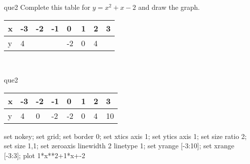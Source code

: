 \documentclass[13.5pt, varwidth=true]{beamer}
\begin{document}
\begin{frame}[shrink=19,fragile]
	\begin{beamercolorbox}[rounded=true, left, shadow=true,wd=14.8cm]{que2}
		 Complete this table for $y = x^{2} + x - 2$ and draw the graph. \\[0.3cm] \renewcommand{\arraystretch}{1.2}\begin{tabular}{|C|C|C|C|C|C|C|C|} \hline x & -3 & -2 & -1 & 0 & 1 & 2 & 3 \\ \hline y & 4 &  &  & -2 & 0 & 4 & \\ \hline \end{tabular}\\[0.3cm]
	\end{beamercolorbox}
\end{frame}
\begin{frame}[shrink=19,fragile]
	\begin{beamercolorbox}[rounded=true, left, shadow=true,wd=14.8cm]{que2}
		\renewcommand{\arraystretch}{1.2}\begin{tabular}{|C|C|C|C|C|C|C|C|} \hline x & -3 & -2 & -1 & 0 & 1 & 2 & 3 \\ \hline y & 4 & 0 & -2 & -2 & 0 & 4 & 10\\ \hline \end{tabular}\begin{gnuplot}[terminal=pdf] set nokey; set grid; set border 0; set xtics axis 1; set ytics axis 1; set size ratio 2; set size 1,1; set zeroaxis linewidth 2 linetype 1; set yrange [-3:10]; set xrange [-3:3]; plot 1*x**2+1*x+-2 \end{gnuplot}
	\end{beamercolorbox}
\end{frame}
\end{document}

